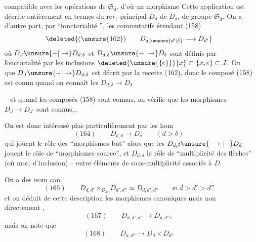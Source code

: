 compatible avec les opérations de $\mathfrak S_d$, d'où un morphisme
 Cette application est décrite entièrement en termes du rev. principal $\widetilde D_d$ de $D_d$, de groupe $\mathfrak S_d$,  On a d'autre part, par ``fonctorialité '', les  commutatifs étendant (158)
\[
\deleted{(\unsure{162})\qquad D_{d,\unsure{d'|\delta}}\longrightarrow D_{d'}}
\]
où $D_J\unsure{-|\to}D_{d,\delta}$ et $D_{d,\delta}\unsure{-|\to}D_\delta$ sont définis par fonctorialité par les inclusions $\deleted{\unsure{\{e\}}}\{x\}\subset\{x,e\}\subset J$. On  que $D_J\unsure{-|\to}D_{d,\delta}$ est décrit par la recette (162), donc le composé (158) est connu quand on connaît les $D_{d,\delta}\longrightarrow D_\delta$

-- et quand les composés (158) sont connus, on vérifie que les morphismes $D_J\longrightarrow D_{J'}$ sont connus,..

On est donc intéressé plus particulièrement par les hom
\[
(164)\qquad D_{d,\delta}\longrightarrow D_\delta\qquad(d>\delta)
\]
qui jouent le rôle des ``morphismes but'' alors que les $D_{d,\delta}\unsure{\longrightarrow|-}D_d$ jouent le rôle de ``morphismes source'', et $D_{d,\delta}$ le rôle de ``multiplicité des flèches'' (où mor. d'inclusion) -- entre éléments de sous-multiplicité  associés à $D$.

On a des isom can.
\[
(165)\qquad D_{d,d'}\times_{D_{d'}}D_{d',d''}\simeq D_{d,d',d''}\qquad\text{si }d>d'>d''
\]
et on  déduit de cette description les morphismes canoniques
mais non directement ,
\[
(167)\qquad D_{d,d',d''}\longrightarrow D_{d,d''},
\]
mais on note que
\[
(168)\qquad D_{d,d''}\longrightarrow D_d\times D_{d''}
\]

